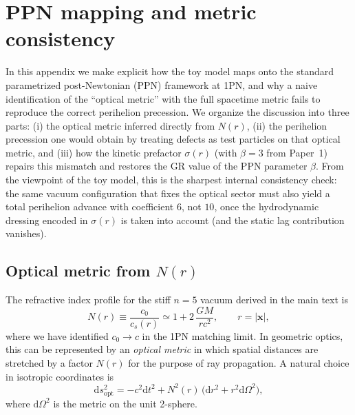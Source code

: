 \documentclass[11pt]{article}
\begin{document}
\section{PPN mapping and metric consistency}
\label{app:ppn-metric}

In this appendix we make explicit how the toy model maps onto the standard
parametrized post-Newtonian (PPN) framework at 1PN, and why a naive
identification of the ``optical metric'' with the full spacetime metric
fails to reproduce the correct perihelion precession.
We organize the discussion into three parts:
(i) the optical metric inferred directly from $N(r)$,
(ii) the perihelion precession one would obtain by treating defects as
test particles on that optical metric, and
(iii) how the kinetic prefactor $\sigma(r)$ (with $\beta=3$ from Paper~1)
repairs this mismatch and restores the GR value of the PPN parameter $\beta$.
From the viewpoint of the toy model, this is the sharpest internal
consistency check: the same vacuum configuration that fixes the optical
sector must also yield a total perihelion advance with coefficient $6$,
not $10$, once the hydrodynamic dressing encoded in $\sigma(r)$ is taken into
account (and the static lag contribution vanishes).


\subsection{Optical metric from \texorpdfstring{$N(r)$}{N(r)}}
\label{subsec:app-optical-metric}

The refractive index profile for the stiff $n=5$ vacuum derived in the main
text is
\begin{equation}
  N(r)
  \equiv \frac{c_0}{c_s(r)}
  \simeq 1 + 2\,\frac{GM}{r c^2},
  \qquad
  r = |\mathbf{x}|,
  \label{eq:app-ppn-N}
\end{equation}
where we have identified $c_0\to c$ in the 1PN matching limit.
In geometric optics, this can be represented by an \emph{optical metric}
in which spatial distances are stretched by a factor $N(r)$ for the
purpose of ray propagation.
A natural choice in isotropic coordinates is
\begin{equation}
  \mathrm{d}s^2_{\text{opt}}
  = -c^2 \mathrm{d}t^2
    + N^2(r)\,
      \bigl(\mathrm{d}r^2 + r^2 \mathrm{d}\Omega^2\bigr),
  \label{eq:app-ppn-optical-metric}
\end{equation}
where $\mathrm{d}\Omega^2$ is the metric on the unit 2-sphere.
\end{document}
